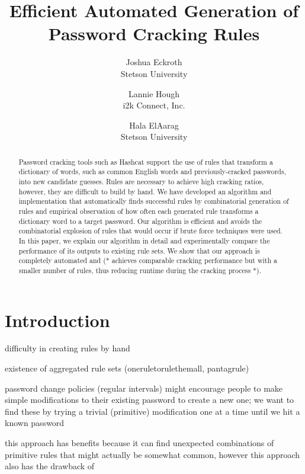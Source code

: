 \documentclass[letterpaper,twocolumn,10pt]{article}
\begin{document}
\date{}

\title{\Large \bf Efficient Automated Generation of Password Cracking Rules}

\author{
{\rm Joshua Eckroth}\\
Stetson University
\and
{\rm Lannie Hough}\\
i2k Connect, Inc.
\and
{\rm Hala ElAarag}\\
Stetson University
}

\maketitle

\begin{abstract}
Password cracking tools such as Hashcat support the use of rules that transform
a dictionary of words, such as common English words and previously-cracked
passwords, into new candidate guesses. Rules are necessary to achieve high
cracking ratios, however, they are difficult to build by hand. We have
developed an algorithm and implementation that automatically finds successful
rules by combinatorial generation of rules and empirical observation of how
often each generated rule transforms a dictionary word to a target password.
Our algorithm is efficient and avoids the combinatorial explosion of rules that
would occur if brute force techniques were used. In this paper, we explain our
algorithm in detail and experimentally compare the performance of its outputs to
existing rule sets. We show that our approach is completely automated and
(* achieves comparable cracking performance but with a smaller number of rules,
thus reducing runtime during the cracking process *).
\end{abstract}


\section{Introduction}

difficulty in creating rules by hand

existence of aggregated rule sets (oneruletorulethemall, pantagrule)

password change policies (regular intervals) might encourage people to make
simple modifications to their existing password to create a new one; we want
to find these by trying a trivial (primitive) modification one at a time until
we hit a known password

this approach has benefits because it can find unexpected combinations of
primitive rules that might actually be somewhat common, however this approach
also has the drawback of
\end{document}
